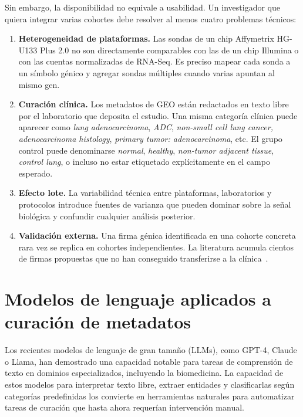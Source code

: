 Sin embargo, la disponibilidad no equivale a usabilidad. Un investigador que
quiera integrar varias cohortes debe resolver al menos cuatro problemas
técnicos:

\begin{enumerate}
  \item \textbf{Heterogeneidad de plataformas.} Las sondas de un chip
  Affymetrix HG-U133 Plus 2.0 no son directamente comparables con las de un
  chip Illumina o con las cuentas normalizadas de RNA-Seq. Es preciso
  mapear cada sonda a un símbolo génico y agregar sondas múltiples cuando
  varias apuntan al mismo gen.
  \item \textbf{Curación clínica.} Los metadatos de GEO están redactados en
  texto libre por el laboratorio que deposita el estudio. Una misma
  categoría clínica puede aparecer como \emph{lung adenocarcinoma},
  \emph{ADC}, \emph{non-small cell lung cancer, adenocarcinoma histology},
  \emph{primary tumor: adenocarcinoma}, etc. El grupo control puede
  denominarse \emph{normal}, \emph{healthy}, \emph{non-tumor adjacent
  tissue}, \emph{control lung}, o incluso no estar etiquetado
  explícitamente en el campo esperado.
  \item \textbf{Efecto lote.} La variabilidad técnica entre plataformas,
  laboratorios y protocolos introduce fuentes de varianza que pueden
  dominar sobre la señal biológica y confundir cualquier análisis
  posterior.
  \item \textbf{Validación externa.} Una firma génica identificada en una
  cohorte concreta rara vez se replica en cohortes independientes. La
  literatura acumula cientos de firmas propuestas que no han conseguido
  transferirse a la clínica~\cite{ioannidis2005false}.
\end{enumerate}

\section{Modelos de lenguaje aplicados a curación de metadatos}
\label{sec:llm}

Los recientes modelos de lenguaje de gran tamaño (LLMs), como GPT-4, Claude
o Llama, han demostrado una capacidad notable para tareas de comprensión de
texto en dominios especializados, incluyendo la biomedicina. La capacidad
de estos modelos para interpretar texto libre, extraer entidades y
clasificarlas según categorías predefinidas los convierte en herramientas
naturales para automatizar tareas de curación que hasta ahora requerían
intervención manual.

